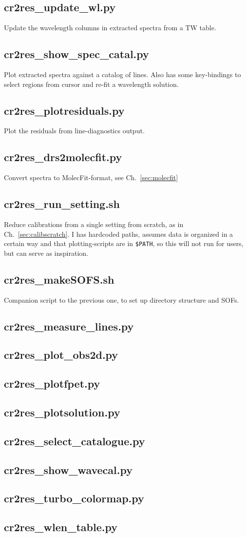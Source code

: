 \subsection{cr2res\_update\_wl.py}
Update the wavelength columns in extracted spectra from a TW table.

\subsection{cr2res\_show\_spec\_catal.py}
Plot extracted spectra against a catalog of lines. Also has some key-bindings
to select regions from cursor and re-fit a wavelength solution.

\subsection{cr2res\_plotresiduals.py}
Plot the residuals from line-diagnostics output.

\subsection{cr2res\_drs2molecfit.py}
Convert spectra to MolecFit-format, see Ch.~\ref{sec:molecfit}

\subsection{cr2res\_run\_setting.sh}
Reduce calibrations from a single setting from scratch, as in
Ch.~\ref{sec:calibscratch}. I has hardcoded paths, assumes data is organized in
a certain way and that plotting-scripts are in \verb!$PATH!, so this will not
run for users, but can serve as inspiration.

\subsection{cr2res\_makeSOFS.sh}
Companion script to the previous one, to set up directory structure and SOFs.

\subsection{cr2res\_measure\_lines.py}
\subsection{cr2res\_plot\_obs2d.py}
\subsection{cr2res\_plotfpet.py}
\subsection{cr2res\_plotsolution.py}
\subsection{cr2res\_select\_catalogue.py}
\subsection{cr2res\_show\_wavecal.py}
\subsection{cr2res\_turbo\_colormap.py}
\subsection{cr2res\_wlen\_table.py}
